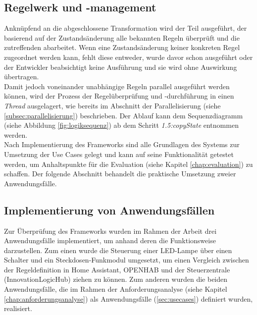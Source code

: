 \subsection{Regelwerk und -management}
    Anknüpfend an die abgeschlossene Transformation wird der Teil ausgeführt, der basierend auf der Zustandsänderung 
    alle bekannten Regeln überprüft und die zutreffenden abarbeitet. Wenn eine Zustandsänderung keiner konkreten Regel zugeordnet 
    werden kann, fehlt diese entweder, wurde davor schon ausgeführt oder der Entwickler beabsichtigt keine Ausführung und sie 
    wird ohne Auswirkung übertragen. 
    \\
    Damit jedoch voneinander unabhängige Regeln parallel ausgeführt werden können, wird der Prozess der Regelüberprüfung und -durchführung 
    in einen \textit{Thread} ausgelagert, wie bereits im Abschnitt der Parallelisierung (siehe \ref{subsec:parallelisierung}) beschrieben. Der Ablauf kann dem 
    Sequenzdiagramm (siehe Abbildung \ref{fig:logiksequenz}) ab dem Schritt \textit{1.5:copyState} entnommen werden. 
    \\
    \linebreak
    Nach Implementierung des Frameworks sind alle Grundlagen des Systems zur Umsetzung der Use Cases gelegt und kann auf seine Funktionalität getestet werden, um 
    Anhaltspunkte für die Evaluation (siehe Kapitel \ref{chap:evaluation}) zu schaffen. Der folgende Abschnitt behandelt die praktische 
    Umsetzung zweier Anwendungsfälle. 

\subsection{Implementierung von Anwendungsfällen}
    Zur Überprüfung des Frameworks wurden im Rahmen der Arbeit drei Anwendungsfälle implementiert, um anhand deren die Funktionsweise 
    darzustellen. Zum einen wurde die Steuerung einer LED-Lampe über einen Schalter und ein Steckdosen-Funkmodul umgesetzt, um einen Vergleich zwischen der 
    Regeldefinition in Home Assistant, \acs{OPENHAB} und der Steuerzentrale (InnovationLogicHub) ziehen zu können. Zum anderen wurden die beiden 
    Anwendungsfälle, die im Rahmen der Anforderungsanalyse (siehe Kapitel \ref{chap:anforderungsanalyse}) als Anwendungsfälle (\ref{sec:usecases}) definiert wurden, realisiert. 
    
